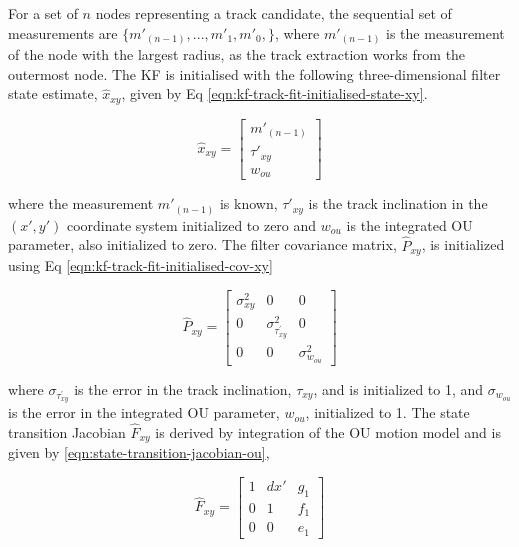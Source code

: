 For a set of $n$ nodes representing a track candidate, the sequential set of measurements are $\{m'_{(n-1)}, ..., m'_1, m'_0, \}$, where $m'_{(n-1)}$ is the measurement of the node with the largest radius, as the track extraction works from the outermost node. The KF is initialised with the following three-dimensional filter state estimate, $\hat{x}_{xy}$, given by Eq \eqref{eqn:kf-track-fit-initialised-state-xy}.


\begin{equation}
\hat{x}_{xy} = \begin{bmatrix} m'_{(n-1)} \\ \tau'_{xy} \\ w_{ou} \end{bmatrix} 
\label{eqn:kf-track-fit-initialised-state-xy}
\end{equation}

where the measurement $m'_{(n-1)}$ is known, $\tau'_{xy}$ is the track inclination in the $(x', y')$ coordinate system initialized to zero and $w_{ou}$ is the integrated OU parameter, also initialized to zero. The filter covariance matrix, $\hat{P}_{xy}$, is initialized using Eq \eqref{eqn:kf-track-fit-initialised-cov-xy}

\begin{equation}
\hat{P}_{xy} = \begin{bmatrix} \sigma_{xy}^2 & 0 & 0 
                            \\ 0 & \sigma_{\tau^{'}_{xy}}^2 & 0 
                            \\ 0 & 0 & \sigma_{w_{ou}}^2 \end{bmatrix} 
\label{eqn:kf-track-fit-initialised-cov-xy}
\end{equation}

where $\sigma_{\tau^{'}_{xy}}$ is the error in the track inclination, $\tau_{xy}$, and is initialized to 1, and $\sigma_{w_{ou}}$ is the error in the integrated OU parameter, $w_{ou}$, initialized to 1. The state transition Jacobian $\hat{F}_{xy}$ is derived by integration of the OU motion model \cite{OU} and is given by \eqref{eqn:state-transition-jacobian-ou},

\begin{equation}
\hat{F}_{xy} = \begin{bmatrix} 1 & dx' & g_1 \\ 0 & 1 & f_1 \\ 0 & 0 & e_1 \end{bmatrix} 
\label{eqn:state-transition-jacobian-ou}
\end{equation}

